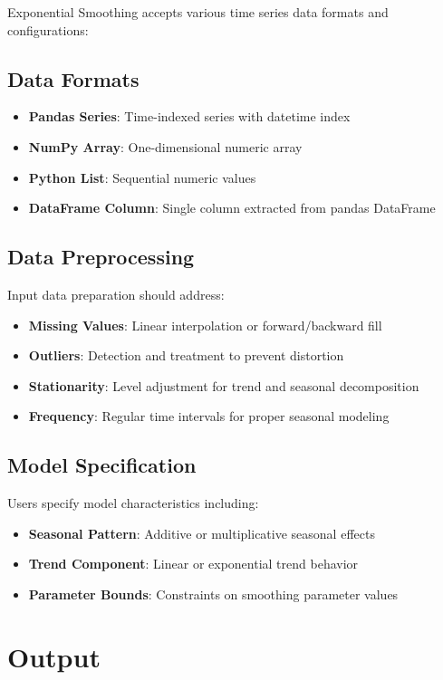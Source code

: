 Exponential Smoothing accepts various time series data formats and configurations:

\subsection{Data Formats}
\begin{itemize}
    \item \textbf{Pandas Series}: Time-indexed series with datetime index
    \item \textbf{NumPy Array}: One-dimensional numeric array
    \item \textbf{Python List}: Sequential numeric values
    \item \textbf{DataFrame Column}: Single column extracted from pandas DataFrame
\end{itemize}

\subsection{Data Preprocessing}
Input data preparation should address:
\begin{itemize}
    \item \textbf{Missing Values}: Linear interpolation or forward/backward fill
    \item \textbf{Outliers}: Detection and treatment to prevent distortion
    \item \textbf{Stationarity}: Level adjustment for trend and seasonal decomposition
    \item \textbf{Frequency}: Regular time intervals for proper seasonal modeling
\end{itemize}

\subsection{Model Specification}
Users specify model characteristics including:
\begin{itemize}
    \item \textbf{Seasonal Pattern}: Additive or multiplicative seasonal effects
    \item \textbf{Trend Component}: Linear or exponential trend behavior
    \item \textbf{Parameter Bounds}: Constraints on smoothing parameter values
\end{itemize}

\section{Output}
\label{sec:output}

